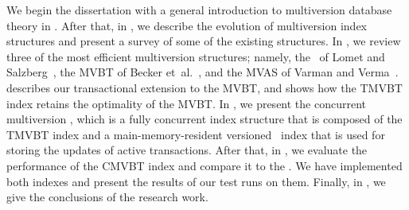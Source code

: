 We begin the dissertation with a general introduction to multiversion
database theory in . 
After that, in , we describe the evolution of
multiversion index structures and present a survey of some of the existing
structures.
In , we review three of the most efficient
multiversion structures; namely, the \TSBtree\ of Lomet and
Salzberg~\cite{lomet:1989:tsb,lomet:1990:tsb-performance}, the MVBT of
Becker et~al.~\cite{becker:1993:optimal,becker:1996:mvbt}, and the
MVAS of Varman and Verma~\cite{varman:1997:multiversion}.
 describes our transactional extension to
the MVBT, and shows how the TMVBT index retains the optimality of the MVBT\@.
In , we present the concurrent multiversion \Btree,
which is a fully concurrent index structure that is composed of the
TMVBT index and a main-memory-resident versioned \Btree\ index 
that is used for storing the updates of active transactions. 
After that, in , we evaluate the performance of
the CMVBT index and compare it to the \TSBtree. 
We have implemented both indexes and present the results of our
test runs on them.
Finally, in , we give the conclusions
of the research work.
 

